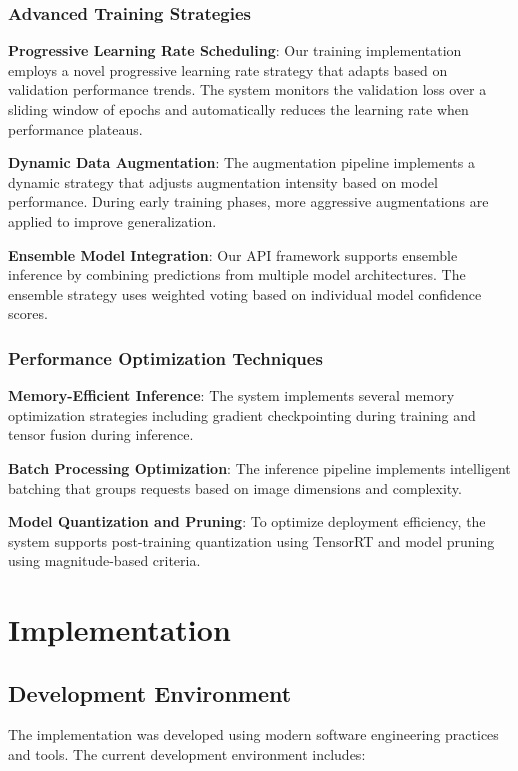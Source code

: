 \documentclass[12pt,a4paper]{article}
\begin{document}
\subsubsection{Advanced Training Strategies}

\textbf{Progressive Learning Rate Scheduling}: Our training implementation employs a novel progressive learning rate strategy that adapts based on validation performance trends. The system monitors the validation loss over a sliding window of epochs and automatically reduces the learning rate when performance plateaus.

\textbf{Dynamic Data Augmentation}: The augmentation pipeline implements a dynamic strategy that adjusts augmentation intensity based on model performance. During early training phases, more aggressive augmentations are applied to improve generalization.

\textbf{Ensemble Model Integration}: Our API framework supports ensemble inference by combining predictions from multiple model architectures. The ensemble strategy uses weighted voting based on individual model confidence scores.

\subsubsection{Performance Optimization Techniques}

\textbf{Memory-Efficient Inference}: The system implements several memory optimization strategies including gradient checkpointing during training and tensor fusion during inference.

\textbf{Batch Processing Optimization}: The inference pipeline implements intelligent batching that groups requests based on image dimensions and complexity.

\textbf{Model Quantization and Pruning}: To optimize deployment efficiency, the system supports post-training quantization using TensorRT and model pruning using magnitude-based criteria.

\section{Implementation}

\subsection{Development Environment}

The implementation was developed using modern software engineering practices and tools. The current development environment includes:
\end{document}
